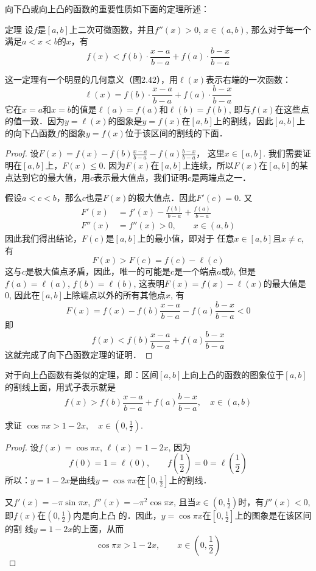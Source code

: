 向下凸或向上凸的函数的重要性质如下面的定理所述：

\begin{blk}
    {定理} 设$f$是$[a,b]$上二次可微函数，并且$f''(x)>0$, $x\in (a,b)$, 那么对于每一个满足$a<x<b$的$x$，有
\[f(x)<f(b)\cdot \frac{x-a}{b-a}+f(a)\cdot \frac{b-x}{b-a}\]
\end{blk}

这一定理有一个明显的几何意义（图2.42），用$\ell(x)$表示右端的一次函数：
\[\ell(x)=f(b)\cdot \frac{x-a}{b-a}+f(a)\cdot \frac{b-x}{b-a}\]
    它在$x=a$和$x=b$的值是$\ell(a)=f(a)$和$\ell(b)=f(b)$, 即与$f(x)$在这些点的值一致．因为$y=\ell(x)$的图象是$y=f(x)$在$[a,b]$上的割线，因此$[a,b]$上的向下凸函数$f$的图象$y=f(x)$位于该区间的割线的下面．





\begin{proof}
设$F(x)=f(x)-f(b)\frac{x-a}{b-a}-f(a)\frac{b-x}{b-a}$，
这里$x\in [a,b]$. 我们需要证明在$[a,b]$上，$F(x)\le 0$. 因为$F(x)$在$[a,b]$上连续，所以$F(x)$在$[a,b]$的某点达到它的最大值，用$c$表示最大值点，我们证明$c$是两端点之一．

假设$a<c<b$，那么$c$也是$F(x)$的极大值点．因此$F'(c)=0$. 又
\begin{align*}
    F'(x)&=f'(x)-\frac{f(b)}{b-a}+\frac{f(a)}{b-a}\\
    F''(x)&=f''(x)>0,\qquad x\in(a,b)
\end{align*}
因此我们得出结论，$F(c)$是$[a,b]$上的最小值，即对于
任意$x\in [a,b]$且$x\ne c$, 有
\[F (x) > F (c) =f (c) -\ell (c)\]
这与$c$是极大值点矛盾，因此，唯一的可能是$c$是一个端点$a$或$b$, 但是$f(a)=\ell(a)$, $f(b)=\ell(b)$, 这表明$F(x)=f(x)-\ell(x)$的最大值是0, 因此在$[a,b]$上除端点以外的所有其他点$x$, 有
\[F (x) =f (x) -f (b) \frac{x-a}{b-a}-f (a) \frac{b-x}{b-a}<0\]
即
\[f (x)<f (b) \frac{x-a}{b-a}+f (a) \frac{b-x}{b-a}\]
这就完成了向下凸函数定理的证明．
\end{proof}

对于向上凸函数有类似的定理，即：区间$[a,b]$上向上凸的函数的图象位于$[a,b]$的割线上面，用式子表示就是
\[f (x)>f (b) \frac{x-a}{b-a}+f (a) \frac{b-x}{b-a},\quad x\in(a,b)\]

\begin{example}
    求证 $\cos\pi x>1-2x,\quad x\in\left(0, \frac{1}{2}\right)$.
\end{example}


\begin{proof}
    设$f(x)=\cos\pi x$, $\ell (x)=1-2x$, 因为
\[f (0) =1=\ell (0) ,\qquad f \left(\frac{1}{2}\right) =0=\ell\left(\frac{1}{2}\right)\]
所以：$y=1-2x$是曲线$y=\cos\pi x$在$\left[0,\frac{1}{2}\right]$上的割线．

又$f'(x)=-\pi \sin\pi x$, $f''(x)=-\pi^2\cos\pi x$, 且当$x\in \left(0,\frac{1}{2}\right)$时，有$f''(x)<0$, 即$f(x)$在$\left(0,\frac{1}{2}\right)$内是向上凸
的．因此，$y=\cos\pi x$在$\left[0,\frac{1}{2}\right]$上的图象是在该区间的割
线$y=1-2x$的上面，从而
\[\cos\pi x>1-2x,\qquad x\in \left(0,\frac{1}{2}\right)\]
\end{proof}

